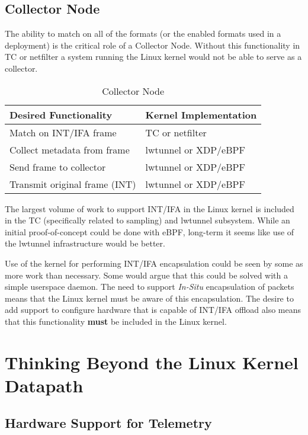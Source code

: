 \documentclass[letterpaper,twocolumn,10pt]{article}
\begin{document}
\subsection{Collector Node}
The ability to match on all of the formats (or the enabled formats used
in a deployment) is the critical role of a Collector Node.  Without this
functionality in TC or netfilter a system running the Linux kernel would
not be able to serve as a collector.
\begin{table}[h!]
  \begin{center}
    \caption{Collector Node}
    \label{tab:table3}
    \begin{tabular}{l|l}
      \textbf{Desired Functionality} & \textbf{Kernel Implementation} \\
      \hline
      Match on INT/IFA frame & TC or netfilter \\
      \hline
      Collect metadata from frame & lwtunnel or XDP/eBPF \\
      \hline
      Send frame to collector & lwtunnel or XDP/eBPF \\
      \hline
      Transmit original frame (INT) & lwtunnel or XDP/eBPF \\
    \end{tabular}
  \end{center}
\end{table}

The largest volume of work to support INT/IFA in the Linux kernel
is included in the TC (specifically related to sampling) and lwtunnel
subsystem.  While an initial proof-of-concept could be done with eBPF,
long-term it seems like use of the lwtunnel infrastructure would be
better.

Use of the kernel for performing INT/IFA encapsulation could be seen by
some as more work than necessary.  Some would argue that this could be
solved with a simple userspace daemon.  The need to support
\textit{In-Situ} encapsulation of packets means that the Linux kernel
must be aware of this encapsulation.  The desire to add support to
configure hardware that is capable of INT/IFA offload also means that
this functionality \textbf{must} be included in the Linux kernel.

\section{Thinking Beyond the Linux Kernel Datapath}

\subsection{Hardware Support for Telemetry}
\end{document}
